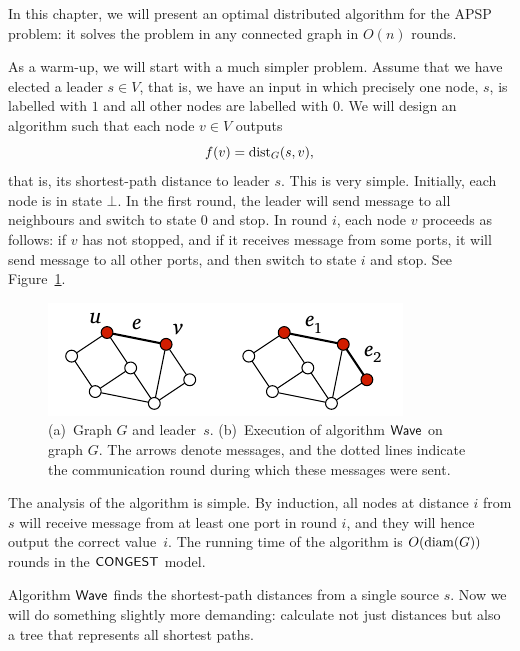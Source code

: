 In this chapter, we will present an optimal distributed algorithm for the APSP problem: it solves the problem in any connected graph in $O(n)$ rounds.

\newcommand{\BFS}{\algo{BFS}}
\newcommand{\Wave}{\algo{Wave}}

\label{sec:wave}

As a warm-up, we will start with a much simpler problem. Assume that we have elected a leader $s \in V$, that is, we have an input in which precisely one node, $s$, is labelled with $1$ and all other nodes are labelled with $0$. We will design an algorithm such that each node $v \in V$ outputs
\[
    f(v) = \operatorname{dist}_G(s,v),
\]
that is, its shortest-path distance to leader $s$. This is very simple. Initially, each node is in state $\bot$. In the first round, the leader will send message  to all neighbours and switch to state $0$ and stop. In round $i$, each node $v$ proceeds as follows: if $v$ has not stopped, and if it receives message  from some ports, it will send message  to all other ports, and then switch to state $i$ and stop. See Figure~\ref{fig:wave}.

\begin{figure}
    \centering
    \includegraphics[page=\PWave]{figs.pdf}
    \caption{(a)~Graph $G$ and leader~$s$. (b)~Execution of algorithm $\Wave$ on graph $G$. The arrows denote  messages, and the dotted lines indicate the communication round during which these messages were sent.}\label{fig:wave}
\end{figure}

The analysis of the algorithm is simple. By induction, all nodes at distance $i$ from $s$ will receive message  from at least one port in round $i$, and they will hence output the correct value~$i$. The running time of the algorithm is $O(\operatorname{diam}(G))$ rounds in the $\textup{\sffamily CONGEST}$ model.


\label{sec:bfs}

Algorithm $\Wave$ finds the shortest-path distances from a single source $s$. Now we will do something slightly more demanding: calculate not just distances but also a tree that represents all shortest paths.

